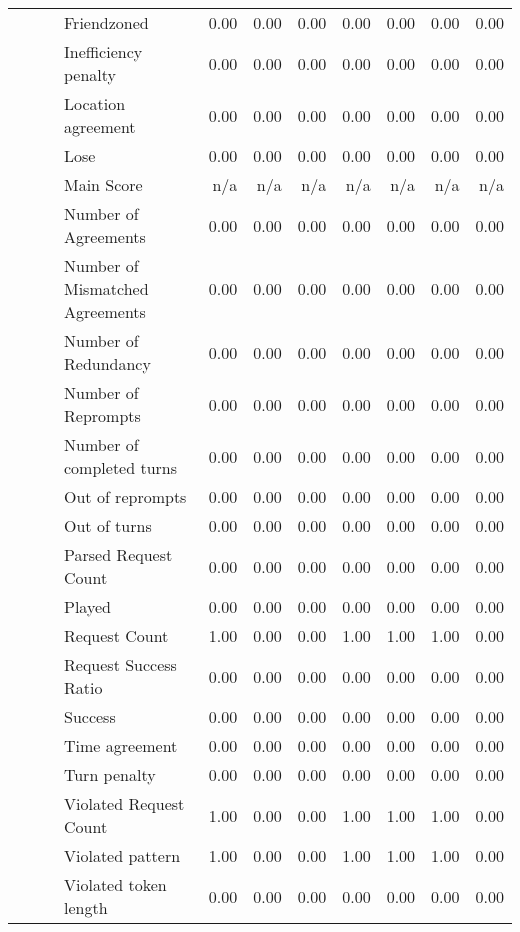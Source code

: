 \begin{tabular}{llllrrrrrrr}
 &  &  & Friendzoned & 0.00 & 0.00 & 0.00 & 0.00 & 0.00 & 0.00 & 0.00 \\
 &  &  & Inefficiency penalty & 0.00 & 0.00 & 0.00 & 0.00 & 0.00 & 0.00 & 0.00 \\
 &  &  & Location agreement & 0.00 & 0.00 & 0.00 & 0.00 & 0.00 & 0.00 & 0.00 \\
 &  &  & Lose & 0.00 & 0.00 & 0.00 & 0.00 & 0.00 & 0.00 & 0.00 \\
 &  &  & Main Score & n/a & n/a & n/a & n/a & n/a & n/a & n/a \\
 &  &  & Number of Agreements & 0.00 & 0.00 & 0.00 & 0.00 & 0.00 & 0.00 & 0.00 \\
 &  &  & Number of Mismatched Agreements & 0.00 & 0.00 & 0.00 & 0.00 & 0.00 & 0.00 & 0.00 \\
 &  &  & Number of Redundancy & 0.00 & 0.00 & 0.00 & 0.00 & 0.00 & 0.00 & 0.00 \\
 &  &  & Number of Reprompts & 0.00 & 0.00 & 0.00 & 0.00 & 0.00 & 0.00 & 0.00 \\
 &  &  & Number of completed turns & 0.00 & 0.00 & 0.00 & 0.00 & 0.00 & 0.00 & 0.00 \\
 &  &  & Out of reprompts & 0.00 & 0.00 & 0.00 & 0.00 & 0.00 & 0.00 & 0.00 \\
 &  &  & Out of turns & 0.00 & 0.00 & 0.00 & 0.00 & 0.00 & 0.00 & 0.00 \\
 &  &  & Parsed Request Count & 0.00 & 0.00 & 0.00 & 0.00 & 0.00 & 0.00 & 0.00 \\
 &  &  & Played & 0.00 & 0.00 & 0.00 & 0.00 & 0.00 & 0.00 & 0.00 \\
 &  &  & Request Count & 1.00 & 0.00 & 0.00 & 1.00 & 1.00 & 1.00 & 0.00 \\
 &  &  & Request Success Ratio & 0.00 & 0.00 & 0.00 & 0.00 & 0.00 & 0.00 & 0.00 \\
 &  &  & Success & 0.00 & 0.00 & 0.00 & 0.00 & 0.00 & 0.00 & 0.00 \\
 &  &  & Time agreement & 0.00 & 0.00 & 0.00 & 0.00 & 0.00 & 0.00 & 0.00 \\
 &  &  & Turn penalty & 0.00 & 0.00 & 0.00 & 0.00 & 0.00 & 0.00 & 0.00 \\
 &  &  & Violated Request Count & 1.00 & 0.00 & 0.00 & 1.00 & 1.00 & 1.00 & 0.00 \\
 &  &  & Violated pattern & 1.00 & 0.00 & 0.00 & 1.00 & 1.00 & 1.00 & 0.00 \\
 &  &  & Violated token length & 0.00 & 0.00 & 0.00 & 0.00 & 0.00 & 0.00 & 0.00 \\
\cline{3-11}

\end{tabular}
